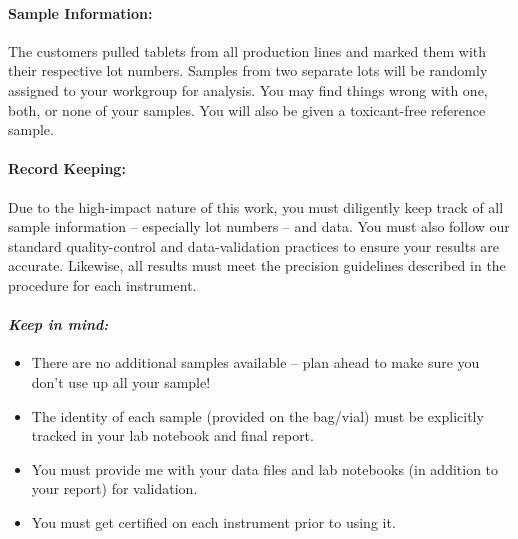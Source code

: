 \documentclass[]{tufte-book}
\providecommand{\tightlist}{%
  \setlength{\itemsep}{0pt}\setlength{\parskip}{0pt}}
\begin{document}
\hypertarget{sample-information-1}{%
\paragraph{\texorpdfstring{\textbf{Sample Information:}}{Sample Information:}}\label{sample-information-1}}

The customers pulled tablets from all production lines and marked them with their respective lot numbers. Samples from two separate lots will be randomly assigned to your workgroup for analysis. You may find things wrong with one, both, or none of your samples. You will also be given a toxicant-free reference sample.

\hypertarget{record-keeping-1}{%
\paragraph{\texorpdfstring{\textbf{Record Keeping:}}{Record Keeping:}}\label{record-keeping-1}}

Due to the high-impact nature of this work, you must diligently keep track of all sample information -- especially lot numbers -- and data. You must also follow our standard quality-control and data-validation practices to ensure your results are accurate. Likewise, all results must meet the precision guidelines described in the procedure for each instrument.

\hypertarget{keep-in-mind-1}{%
\paragraph{\texorpdfstring{\emph{Keep in mind:}}{Keep in mind:}}\label{keep-in-mind-1}}

\begin{itemize}
\tightlist
\item
  There are no additional samples available -- plan ahead to make sure you don't use up all your sample!\\
\item
  The identity of each sample (provided on the bag/vial) must be explicitly tracked in your lab notebook and final report.\\
\item
  You must provide me with your data files and lab notebooks (in addition to your report) for validation.\\
\item
  You must get certified on each instrument prior to using it.
\end{itemize}
\end{document}
